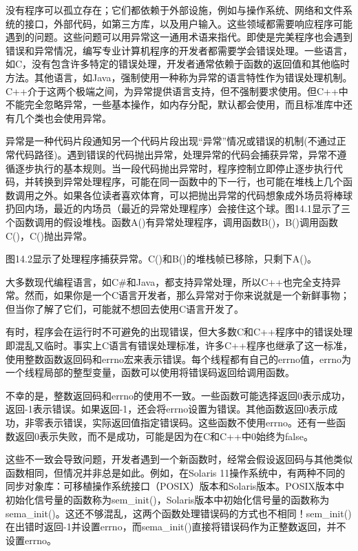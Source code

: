 
没有程序可以孤立存在；它们都依赖于外部设施，例如与操作系统、网络和文件系统的接口，外部代码，如第三方库，以及用户输入。这些领域都需要响应程序可能遇到的问题。这些问题可以用异常这一通用术语来指代。即使是完美程序也会遇到错误和异常情况，编写专业计算机程序的开发者都需要学会错误处理。一些语言，如C，没有包含许多特定的错误处理，开发者通常依赖于函数的返回值和其他临时方法。其他语言，如Java，强制使用一种称为异常的语言特性作为错误处理机制。C++介于这两个极端之间，为异常提供语言支持，但不强制要求使用。但C++中不能完全忽略异常，一些基本操作，如内存分配，默认都会使用，而且标准库中还有几个类也会使用异常。


异常是一种代码片段通知另一个代码片段出现“异常”情况或错误的机制(不通过正常代码路径)。遇到错误的代码抛出异常，处理异常的代码会捕获异常，异常不遵循逐步执行的基本规则。当一段代码抛出异常时，程序控制立即停止逐步执行代码，并转换到异常处理程序，可能在同一函数中的下一行，也可能在堆栈上几个函数调用之外。如果各位读者喜欢体育，可以把抛出异常的代码想象成外场员将棒球扔回内场，最近的内场员（最近的异常处理程序）会接住这个球。图14.1显示了三个函数调用的假设堆栈。函数A()有异常处理程序，调用函数B()，B()调用函数C()，C()抛出异常。


图14.2显示了处理程序捕获异常。C()和B()的堆栈帧已移除，只剩下A()。


大多数现代编程语言，如C\#和Java，都支持异常处理，所以C++也完全支持异常。然而，如果你是一个C语言开发者，那么异常对于你来说就是一个新鲜事物；但当你了解了它们，可能就不想回去使用C语言开发了。


有时，程序会在运行时不可避免的出现错误，但大多数C和C++程序中的错误处理即混乱又临时。事实上C语言有错误处理标准，许多C++程序也继承了这一标准，使用整数函数返回码和errno宏来表示错误。每个线程都有自己的errno值，errno为一个线程局部的整型变量，函数可以使用将错误码返回给调用函数。

不幸的是，整数返回码和errno的使用不一致。一些函数可能选择返回0表示成功，返回-1表示错误。如果返回-1，还会将errno设置为错误。其他函数返回0表示成功，非零表示错误，实际返回值指定错误码。这些函数不使用errno。还有一些函数返回0表示失败，而不是成功，可能是因为在C和C++中0始终为false。

这些不一致会导致问题，开发者遇到一个新函数时，经常会假设返回码与其他类似函数相同，但情况并非总是如此。例如，在Solaris 11操作系统中，有两种不同的同步对象库：可移植操作系统接口（POSIX）版本和Solaris版本。POSIX版本中初始化信号量的函数称为sem\_init()，Solaris版本中初始化信号量的函数称为sema\_init()。这还不够混乱，这两个函数处理错误码的方式也不相同！sem\_init()在出错时返回-1并设置errno，而sema\_init()直接将错误码作为正整数返回，并不设置errno。

